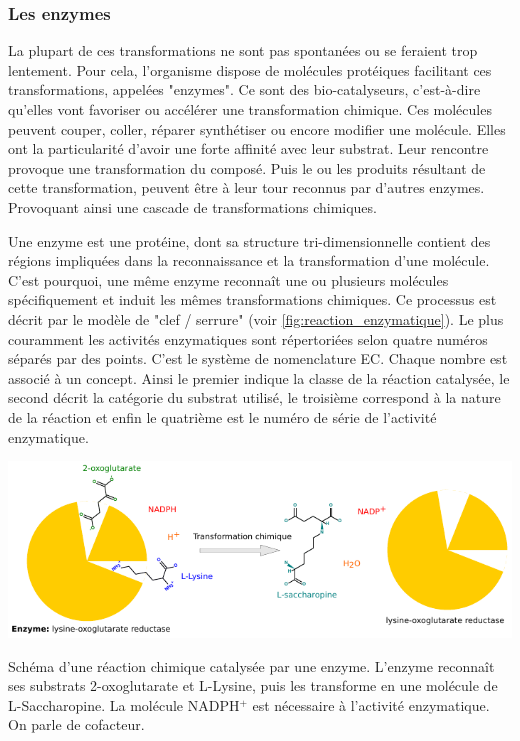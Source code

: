 \begin{refsegment}
    
    \subsubsection{Les enzymes}    
    La plupart de ces transformations ne sont pas spontanées ou se feraient trop lentement. Pour cela, l'organisme dispose de molécules protéiques facilitant ces transformations, appelées "enzymes". Ce sont des bio-catalyseurs, c'est-à-dire qu'elles vont favoriser ou accélérer une transformation chimique. Ces molécules peuvent couper, coller, réparer synthétiser ou encore modifier une molécule. Elles ont la particularité d'avoir une forte affinité avec leur substrat.  Leur rencontre provoque une transformation du composé. Puis le ou les produits résultant de cette transformation, peuvent être à leur tour reconnus par d'autres enzymes. Provoquant ainsi une cascade de transformations chimiques. 
    
    Une enzyme est une protéine, dont sa structure tri-dimensionnelle contient des régions impliquées dans la reconnaissance et la transformation d’une molécule. C'est pourquoi, une même enzyme reconnaît une ou plusieurs molécules spécifiquement et induit les mêmes transformations chimiques. Ce processus est décrit par le modèle de "clef / serrure" (voir \cref{fig:reaction_enzymatique}). Le plus couramment les activités enzymatiques sont répertoriées selon quatre numéros séparés par des points. C'est le système de nomenclature \acrfull{EC}. Chaque nombre est associé à un concept. Ainsi le premier indique la classe de la réaction catalysée, le second décrit la catégorie du substrat utilisé, le troisième correspond à la nature de la réaction et enfin le quatrième est le numéro de série de l'activité enzymatique.
    
    \begin{shadedfigure}[H]
        \centering
        \includegraphics[width=\textwidth]{img/lysine-oxoglutarate_reductase.pdf}
        \caption{Schéma d'une réaction chimique catalysée par une enzyme. L'enzyme reconnaît ses substrats 2-oxoglutarate et L-Lysine, puis les transforme en une molécule de L-Saccharopine. La molécule NADPH$^{+}$ est nécessaire à l'activité enzymatique. On parle de cofacteur.}
        \label{fig:reaction_enzymatique}
    \end{shadedfigure}
    

\end{refsegment}
